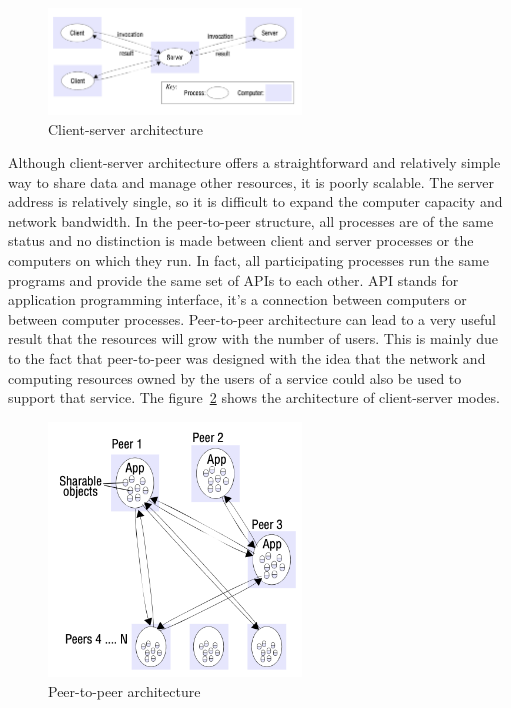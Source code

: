 \documentclass[11pt]{book}
\begin{document}
\begin{center}
\begin{figure}[h]
		\centering
		\includegraphics[width=0.6\textwidth]{clien-server}
		\caption{Client-server architecture}
		\label{fig:client-server}
\end{figure}
\end{center}
Although client-server architecture offers a straightforward and relatively simple way to share data 
and manage other resources, it is poorly scalable. 
The server address is relatively single, so it is difficult to expand the computer capacity and network bandwidth.
In the peer-to-peer structure, 
all processes are of the same status and no distinction is made between client and server processes or the computers on which they run. 
In fact, all participating processes run the same programs and provide the same set of APIs to each other.
API stands for  application programming interface, it's a connection between computers 
or between computer processes.
Peer-to-peer architecture can lead to a very useful result that the resources will grow with the number of users. 
This is mainly due to the fact that peer-to-peer was designed with the idea that the network and computing resources owned by the users of a service 
could also be used to support that service.
The figure~\ref{fig:peer-to-peer} shows the architecture of client-server modes.
\begin{center}
	\begin{figure}[h]
			\centering
			\includegraphics[width=0.6\textwidth]{peer-to-peer}
			\caption{Peer-to-peer architecture}
			\label{fig:peer-to-peer}
	\end{figure}
	\end{center}
\end{document}
